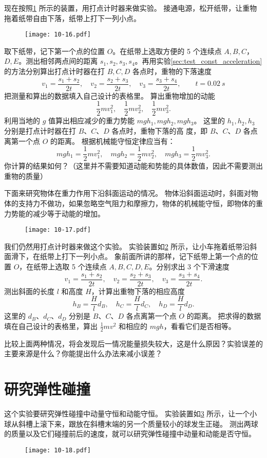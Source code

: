 现在按照\cref{fig:10-16} 所示的装置，用打点计时器来做实验。
接通电源，松开纸带，让重物拖着纸带自由下落，纸带上打下一列小点。
\begin{figure}
  \texttt{[image: 10-16.pdf]}
  \caption{}\label{fig:10-16}
\end{figure}

取下纸带，记下第一个点的位置 $O$。在纸带上选取方便的 5 个连续点 $A,B,C$，$D,E$。测出相邻两点间的距离 $s_1,s_2,s_3,s_4$。再用实验\ref{sec:test_const_acceleration}的方法分别算出打点计时器在打 $B,C,D$ 各点时，重物的下落速度
\[v_1=\frac{s_1+s_2}{2t},\quad v_2=\frac{s_2+s_3}{2t},\quad v_3=\frac{s_3+s_4}{2t},\qquad t=\qty{0.02}{s}\]
把测量和算出的数据填入自己设计的表格里。
算出重物增加的动能
\[\frac{1}{2}mv_1^2, \quad \frac{1}{2}mv_2^2, \quad \frac{1}{2}mv_3^2.\]
利用当地的 $g$ 值算出相应减少的重力势能 $mgh_1,mgh_2,mgh_3$。
这里的 $h_1,h_2,h_3$ 分别是打点计时器在打 $B$、$C$、$D$ 各点时，重物下落的高
度，即 $B$、$C$、$D$ 各点离第一个点 $O$ 的距离。
根据机械能守恒定律应当有：
\[mgh_1=\frac{1}{2}mv^2_1,\quad mgh_2=\frac{1}{2}mv^2_2,\quad mgh_3=\frac{1}{2}mv^2_3.\]
你计算的结果如何？（这里并不需要知道动能和势能的具体数值，因此不需要测出重物的质量）

下面来研究物体在重力作用下沿斜面运动的情况。
物体沿斜面运动时，斜面对物体的支持力不做功，如果忽略空气阻力和摩擦力，物体的机械能守恒，即物体的重力势能的减少等于动能的增加。

\begin{figure}
  \texttt{[image: 10-17.pdf]}
  \caption{}\label{fig:10-17}
\end{figure}

我们仍然用打点计时器来做这个实验。
实验装置如\cref{fig:10-17} 所示，让小车拖着纸带沿斜面滑下，在纸带上打下一列小点。
象前面所讲的那样，记下纸带上第一个点的位置 $O$，在纸带上选取 5 个连续点 $A,B,C,D,E$。分别求出 3 个下滑速度
\[v_1=\frac{s_1+s_2}{2t},\quad v_2=\frac{s_2+s_3}{2t},\quad v_3=\frac{s_3+s_4}{2t}.\]
测出斜面的长度 $l$ 和高度 $H$，计算出重物下落的相应高度
\[h_B=\frac{H}{l}d_B, \quad h_C=\frac{H}{l}d_C, \quad h_D=\frac{H}{l}d_D.\]
这里的 $d_B$、$d_C$、$d_D$ 分别是 $B$、$C$、$D$ 各点离第一个点 $O$ 的距离。
把求得的数据填在自己设计的表格里，算出 $\frac{1}{2}mv^2$ 和相应的 $mgh$，看看它们是否相等。

比较上面两种情况，将会发现后一情况能量损失较大，这是什么原因？实验误差的主要来源是什么？你能提出什么办法来减小误差？

\section{研究弹性碰撞}
这个实验要研究弹性碰撞中动量守恒和动能守恒。
实验装置如\cref{fig:10-18} 所示，让一个小球从斜槽上滚下来，跟放在斜槽末端的另一个质量较小的球发生正碰。
测出两球的质量以及它们碰撞前后的速度，就可以研究弹性碰撞中动量和动能是否守恒。
\begin{figure}
  \texttt{[image: 10-18.pdf]}
  \caption{}\label{fig:10-18}
\end{figure}

